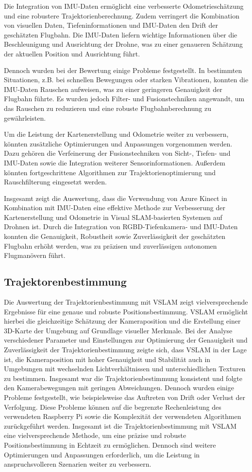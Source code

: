 Die Integration von \ac{IMU}-Daten ermöglicht eine verbesserte Odometrieschätzung und eine robustere Trajektorienberechnung. Zudem verringert die Kombination von visuellen Daten, Tiefeninformationen und IMU-Daten den Drift der geschätzten Flugbahn. Die \ac{IMU}-Daten liefern wichtige Informationen über die Beschleunigung und Ausrichtung der Drohne, was zu einer genaueren Schätzung der aktuellen Position und Ausrichtung führt.

Dennoch wurden bei der Bewertung einige Probleme festgestellt. In bestimmten Situationen, z.B. bei schnellen Bewegungen oder starken Vibrationen, konnten die \ac{IMU}-Daten Rauschen aufweisen, was zu einer geringeren Genauigkeit der Flugbahn führte. Es wurden jedoch Filter- und Fusionstechniken angewandt, um das Rauschen zu reduzieren und eine robuste Flugbahnberechnung zu gewährleisten.

Um die Leistung der Kartenerstellung und Odometrie weiter zu verbessern, könnten zusätzliche Optimierungen und Anpassungen vorgenommen werden. Dazu gehören die Verfeinerung der Fusionstechniken von Sicht-, Tiefen- und IMU-Daten sowie die Integration weiterer Sensorinformationen. Außerdem könnten fortgeschrittene Algorithmen zur Trajektorienoptimierung und Rauschfilterung eingesetzt werden.

Insgesamt zeigt die Auswertung, dass die Verwendung von Azure Kinect in Kombination mit \ac{IMU}-Daten eine effektive Methode zur Verbesserung der Kartenerstellung und Odometrie in Visual SLAM-basierten Systemen auf Drohnen ist. Durch die Integration von RGBD-Tiefenkamera- und \ac{IMU}-Daten konnten die Genauigkeit, Robustheit sowie Zuverlässigkeit der geschätzten Flugbahn erhöht werden, was zu präzisen und zuverlässigen autonomen Flugmanövern führt.

\subsection{Trajektorenbestimmung}
Die Auswertung der Trajektorienbestimmung mit \ac{VSLAM} zeigt vielversprechende Ergebnisse für eine genaue und robuste Positionsbestimmung. \ac{VSLAM} ermöglicht hierbei die gleichzeitige Schätzung der Kameraposition und die Erstellung einer 3D-Karte der Umgebung auf Grundlage visueller Merkmale. Bei der Analyse verschiedener Parameter und Einstellungen zur Optimierung der Genauigkeit und Zuverlässigkeit der Trajektorienbestimmung zeigte sich, dass \ac{VSLAM} in der Lage ist, die Kameraposition mit hoher Genauigkeit und Stabilität auch in Umgebungen mit wechselnden Lichtverhältnissen und unterschiedlichen Texturen zu bestimmen. Insgesamt war die Trajektorienbestimmung konsistent und folgte den Kamerabewegungen mit geringen Abweichungen. Dennoch wurden einige Probleme festgestellt, wie beispielsweise das Auftreten von Drift oder Verlust der Verfolgung. Diese Probleme können auf die begrenzte Rechenleistung des verwendeten Raspberry Pi sowie die Komplexität der verwendeten Algorithmen zurückgeführt werden. Insgesamt ist die Trajektorienbestimmung mit \ac{VSLAM} eine vielversprechende Methode, um eine präzise und robuste Positionsbestimmung in Echtzeit zu ermöglichen. Dennoch sind weitere Optimierungen und Anpassungen erforderlich, um die Leistung in anspruchsvolleren Szenarien weiter zu verbessern.
